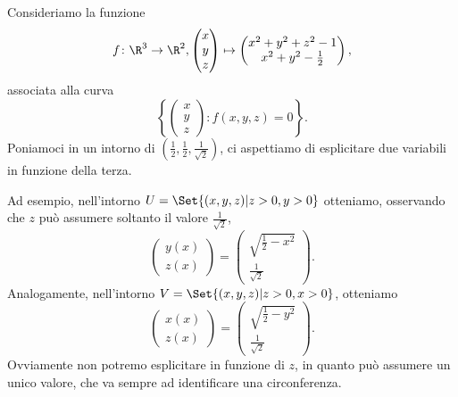 \begin{ese}
	Consideriamo la funzione
	\[
		f\colon\R^3\to\R^2,
		\begin{pmatrix}
			x \\
			y \\
			z
		\end{pmatrix}
		\mapsto
		\begin{pmatrix}
			x^2+y^2+z^2-1 \\
			x^2+y^2-\frac{1}{2}
		\end{pmatrix}
		,
	\]
	associata alla curva
	\[
		\left\{
		\begin{pmatrix}
			x \\
			y \\
			z
		\end{pmatrix}
		:f(x,y,z)=0\right\}.
	\]
	Poniamoci in un intorno di \(\left(\frac{1}{2},\frac{1}{2},\frac{1}{\sqrt{2}}\right)\), ci aspettiamo di esplicitare due variabili in funzione della terza.

	Ad esempio, nell'intorno \(U=\Set{(x,y,z) | z>0,y>0}\) otteniamo, osservando che \(z\) può assumere soltanto il valore \(\frac{1}{\sqrt{2}}\),
	\[
		\begin{pmatrix}
			y(x) \\
			z(x)
		\end{pmatrix}
		=
		\begin{pmatrix}
			\sqrt{\frac{1}{2}-x^2} \\
			\frac{1}{\sqrt{2}}
		\end{pmatrix}
		.
	\]
	Analogamente, nell'intorno \(V=\Set{(x,y,z) | z>0,x>0}\), otteniamo
	\[
		\begin{pmatrix}
			x(x) \\
			z(x)
		\end{pmatrix}
		=
		\begin{pmatrix}
			\sqrt{\frac{1}{2}-y^2} \\
			\frac{1}{\sqrt{2}}
		\end{pmatrix}
		.
	\]
	Ovviamente non potremo esplicitare in funzione di \(z\), in quanto può assumere un unico valore, che va sempre ad identificare una circonferenza.
\end{ese}

